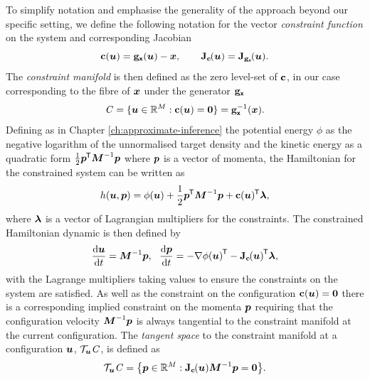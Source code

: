 To simplify notation and emphasise the generality of the approach beyond our specific setting, we define the following notation for the vector \emph{constraint function} on the system and corresponding Jacobian
\begin{equation}\label{eq:constraint-def}
  \vctfunc{c}(\vct{u}) = \genfunc_{\rvct{x}}(\vct{u}) - \vct{x},
  \qquad
  \jacob{\vctfunc{c}}{\vct{u}} = \jacob{\genfunc_{\rvct{x}}}{\vct{u}}.
\end{equation}
The \emph{constraint manifold} is then defined as the zero level-set of ${\mathbf{c}}$, in our case corresponding to the fibre of $\boldsymbol{x}$ under the generator ${\mathbf{g}}_{\boldsymbol{\mathsf{x}}}$
\begin{equation}\label{eq:constraint-manifold-def}
  \mathit{C} = \lbrace \boldsymbol{u} \in \mathbb{R}^M : {\mathbf{c}}(\boldsymbol{u}) = \boldsymbol{0} \rbrace =
  {\mathbf{g}}_{\boldsymbol{\mathsf{x}}}^{-1}(\boldsymbol{x}).
\end{equation}
Defining as in Chapter \ref{ch:approximate-inference} the potential energy $\phi$ as the negative logarithm of the unnormalised target density and the kinetic energy as a quadratic form $\frac{1}{2}\boldsymbol{p}^{\mkern-1.5mu\mathsf{T}}\boldsymbol{M}^{-1}\boldsymbol{p}$ where $\boldsymbol{p}$ is a vector of momenta, the Hamiltonian for the constrained system can be written as
\begin{equation}\label{eq:constrained-hamiltonian}
    h(\boldsymbol{u}, \boldsymbol{p}) = 
    \phi(\boldsymbol{u}) + \frac{1}{2}\boldsymbol{p}^{\mkern-1.5mu\mathsf{T}}\boldsymbol{M}^{-1}\boldsymbol{p}
    + {\mathbf{c}}(\boldsymbol{u})^{\mkern-1.5mu\mathsf{T}}\boldsymbol{\lambda},
\end{equation}
where $\boldsymbol{\lambda}$ is a vector of Lagrangian multipliers for the constraints. The constrained Hamiltonian dynamic is then defined by
\begin{equation}\label{eq:constrained-hamiltonian-dynamic}
    \td{\vct{u}}{t} = \mtx{M}^{-1}\vct{p},
    ~~
    \td{\vct{p}}{t} = -\grad{\phi}{\vct{u}}\tr - \jacob{\vctfunc{c}}{\vct{u}}\tr\vct{\lambda},
\end{equation}
with the Lagrange multipliers taking values to ensure the constraints on the system are satisfied. As well as the constraint on the configuration $\vctfunc{c}\lpa\vct{u}\rpa = \vct{0}$ there is a corresponding implied constraint on the momenta $\boldsymbol{p}$ requiring that the configuration velocity $\boldsymbol{M}^{-1}\boldsymbol{p}$ is always tangential to the constraint manifold at the current configuration. The \emph{tangent space} to the constraint manifold at a configuration $\boldsymbol{u}$, $\mathcal{T}_{\boldsymbol{u}}\mathit{C}$, is defined as
\begin{equation}\label{eq:constraint-tanget-space}
  \sset{T}_{\vct{u}}\set{C} = \lbr \vct{p} \in \reals^M : \jacob{\vctfunc{c}}{\vct{u}}\mtx{M}^{-1}\vct{p} = \vct{0} \rbr.
\end{equation}
